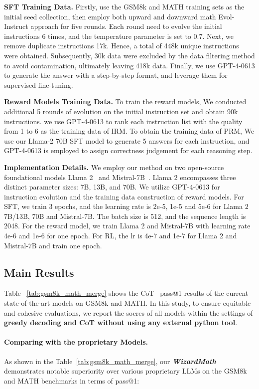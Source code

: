 \textbf{SFT Training Data.} Firstly, use the GSM8k and MATH training sets as the initial seed collection, then employ both upward and downward math Evol-Instruct approach for five rounds. Each round need to evolve the initial instructions 6 times, and the temperature parameter is set to 0.7. Next, we remove duplicate instructions 17k. Hence, a total of 448k unique instructions were obtained. Subsequently, 30k data were excluded by the data filtering method to avoid contamination, ultimately leaving 418k data. Finally, we use GPT-4-0613 to generate the answer with a step-by-step format, and leverage them for supervised fine-tuning.

\textbf{Reward Models Training Data.} To train the reward models, We conducted additional 5 rounds of evolution on the initial instruction set and obtain 90k instructions. we use GPT-4-0613 to rank each instruction list with the quality  from 1 to 6 as the training data of IRM. To obtain the training data of PRM, We use our Llama-2 70B SFT model to generate 5 answers for each instruction, and GPT-4-0613 is employed to assign correctness judgement for each reasoning step.

\textbf{Implementation Details.} We employ our method on two open-source foundational models Llama 2~\citep{touvron2023llama2} and Mistral-7B~\citep{jiang2023mistral}. Llama 2 encompasses three distinct parameter sizes: 7B, 13B, and 70B. We utilize GPT-4-0613 for instruction evolution and  the training data construction of reward models. For SFT, we train 3 epochs, and the learning rate is 2e-5, 1e-5 and 5e-6 for Llama 2 7B/13B, 70B and Mistral-7B. The batch size is 512, and the sequence length is 2048. For the reward model, we train Llama 2 and Mistral-7B with learning rate 4e-6 and 1e-6 for one epoch. For RL, the lr is 4e-7 and 1e-7 for Llama 2 and Mistral-7B and train one epoch.

\subsection{Main Results}

Table ~\ref{tab:gsm8k_math_merge} shows the CoT~\citep{wei2022chain} pass@1 results of the current state-of-the-art models on GSM8k and MATH. In this study, to ensure equitable and cohesive evaluations, we report the socres of all models within the settings of \textbf{greedy decoding and CoT without using any external python tool}. 

\paragraph{Comparing with the proprietary Models.} As shown in the Table~\ref{tab:gsm8k_math_merge}, our \emph{\textbf{WizardMath}} demonstrates notable superiority over various proprietary LLMs on the  GSM8k and MATH benchmarks in terms of pass@1:

